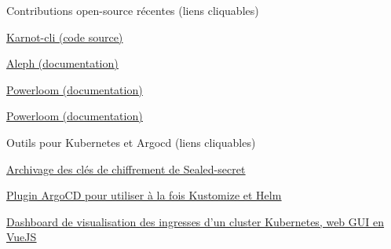 \begin{cventries}
  \cventry
    {} %
    {Contributions open-source récentes (liens cliquables)} %
    {} %
    {} %
    {
      \begin{cvitems} %
        \item {\underline{\href{https://github.com/karnotxyz/karnot-cli/pull/31}{Karnot-cli (code source)}}}
        \item {\underline{\href{https://github.com/aleph-im/aleph-docs/pull/29}{Aleph (documentation)}}}
        \item {\underline{\href{https://github.com/PowerLoom/docs/pull/13}{Powerloom (documentation)}}}
        \item {\underline{\href{https://github.com/PowerLoom/pooler-docs/pull/10}{Powerloom (documentation)}}\\}
      \end{cvitems}
    }
  \cventry
      {} %
      {Outils pour Kubernetes et Argocd (liens cliquables)} %
      {} %
      {} %
      {
        \begin{cvitems} %
          \item {\underline{\href{https://github.com/guillheu/kubernetes-sealed-secrets-key-archiver}{Archivage des clés de chiffrement de Sealed-secret}}}
          \item {\underline{\href{https://github.com/guillheu/argocd-kustomize-helm-cmp}{Plugin ArgoCD pour utiliser à la fois Kustomize et Helm}}}
          \item {\underline{\href{https://github.com/guillheu/K8-ingress-hub}{Dashboard de visualisation des ingresses d'un cluster Kubernetes, web GUI en VueJS}}\\}
        \end{cvitems}
}
\end{cventries}
